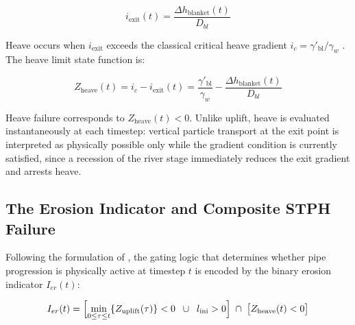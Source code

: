 $$i_\mathrm{exit}(t) = \frac{\Delta h_\mathrm{blanket}(t)}{D_{bl}}$$

Heave occurs when $i_\mathrm{exit}$ exceeds the classical critical heave gradient $i_c = \gamma'_\mathrm{bl}/\gamma_w$ \parencite{terzaghi1943}. The heave limit state function is:

$$Z_\mathrm{heave}(t) = i_c - i_\mathrm{exit}(t) = \frac{\gamma'_\mathrm{bl}}{\gamma_w} - \frac{\Delta h_\mathrm{blanket}(t)}{D_{bl}}$$

Heave failure corresponds to $Z_\mathrm{heave}(t) < 0$. Unlike uplift, heave is evaluated instantaneously at each timestep: vertical particle transport at the exit point is interpreted as physically possible only while the gradient condition is currently satisfied, since a recession of the river stage immediately reduces the exit gradient and arrests heave.

\subsection{The Erosion Indicator and Composite STPH Failure}
\label{subsec: The Erosion Indicator and Composite STPH Failure}

Following the formulation of \textcite{pol_sie_2024}, the gating logic that determines whether pipe progression is physically active at timestep $t$ is encoded by the binary erosion indicator $I_{er}(t)$:

$$I_{er}(t) = \Bigl[\min_{0\le\tau\le t}\{Z_\mathrm{uplift}(\tau)\} < 0\;\;\cup\;\; l_\mathrm{ini} > 0\Bigr] \;\cap\;\bigl[Z_\mathrm{heave}(t) < 0\bigr]$$

